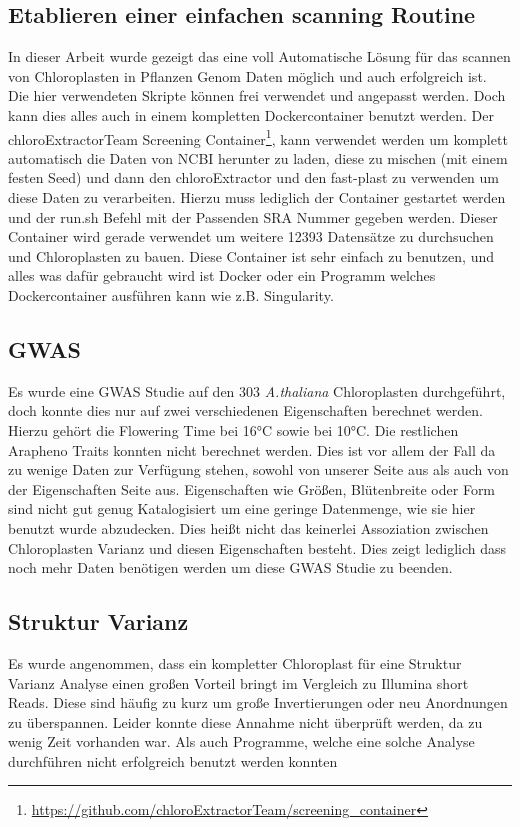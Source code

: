 \documentclass{scrartcl}
\begin{document}
\subsection{Etablieren einer einfachen scanning Routine}
\label{sec-5-5}
In dieser Arbeit wurde gezeigt das eine voll Automatische Lösung für das scannen von Chloroplasten in Pflanzen Genom Daten möglich und auch erfolgreich ist. Die hier verwendeten Skripte können frei verwendet und angepasst werden. 
Doch kann dies alles auch in einem kompletten Dockercontainer benutzt werden. Der chloroExtractorTeam Screening Container\footnote{\url{https://github.com/chloroExtractorTeam/screening_container}}, kann verwendet werden um komplett automatisch die Daten von NCBI herunter zu laden, diese zu mischen
(mit einem festen Seed) und dann den chloroExtractor und den fast-plast zu verwenden um diese Daten zu verarbeiten. Hierzu muss lediglich der Container gestartet werden und der run.sh Befehl mit der Passenden SRA Nummer gegeben 
werden. Dieser Container wird gerade verwendet um weitere 12393 Datensätze zu durchsuchen und Chloroplasten zu bauen. Diese Container ist sehr einfach zu benutzen, und alles was dafür gebraucht wird ist Docker\footnotemark[44]{} oder ein Programm
welches Dockercontainer ausführen kann wie z.B. Singularity\footnotemark[53]{}. 
\subsection{GWAS}
\label{sec-5-6}
Es wurde eine GWAS Studie auf den 303 \emph{A.thaliana} Chloroplasten durchgeführt, doch konnte dies nur auf zwei verschiedenen Eigenschaften berechnet werden. Hierzu gehört die Flowering Time bei 16°C sowie bei 10°C. 
Die restlichen Arapheno Traits konnten nicht berechnet werden. Dies ist vor allem der Fall da zu wenige Daten zur Verfügung stehen, sowohl von unserer Seite aus als auch von der Eigenschaften Seite aus. Eigenschaften wie
Größen, Blütenbreite oder Form sind nicht gut genug Katalogisiert um eine geringe Datenmenge, wie sie hier benutzt wurde abzudecken. Dies heißt nicht das keinerlei Assoziation zwischen Chloroplasten Varianz und diesen Eigenschaften besteht.
Dies zeigt lediglich dass noch mehr Daten benötigen werden um diese GWAS Studie zu beenden‌.
\subsection{Struktur Varianz}
\label{sec-5-7}
Es wurde angenommen, dass ein kompletter Chloroplast für eine Struktur Varianz Analyse einen großen Vorteil bringt im Vergleich zu Illumina short Reads. Diese sind häufig zu kurz um große Invertierungen oder neu Anordnungen zu 
überspannen. Leider konnte diese Annahme nicht überprüft werden, da zu wenig Zeit vorhanden war. Als auch Programme, welche eine solche Analyse durchführen nicht erfolgreich benutzt werden konnten 
\end{document}
